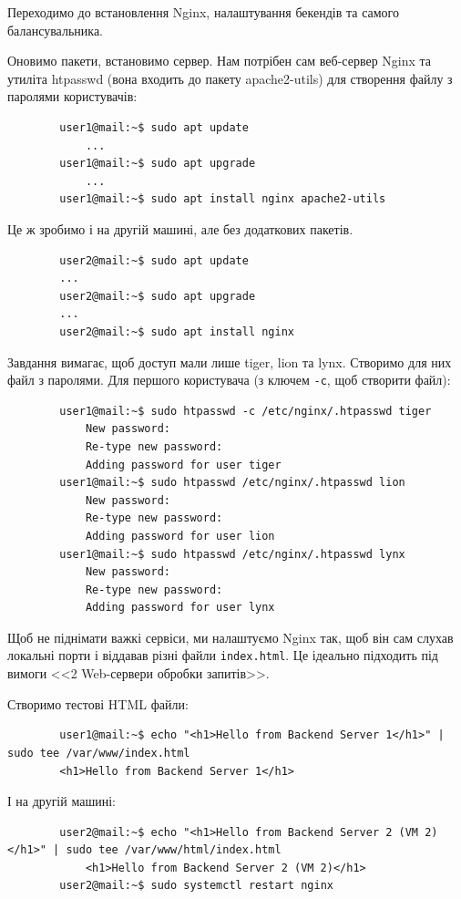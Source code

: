 \documentclass[14pt, a4paper]{extreport}
\begin{document}
	Переходимо до встановлення Nginx, налаштування бекендів та самого балансувальника.
	
	Оновимо пакети, встановимо сервер. Нам потрібен сам веб-сервер Nginx та утиліта htpasswd (вона входить до пакету apache2-utils) для створення файлу з паролями користувачів: \sideat{[VM 1]}
	
	\begin{verbatim}
		user1@mail:~$ sudo apt update
			...
		user1@mail:~$ sudo apt upgrade
			...
		user1@mail:~$ sudo apt install nginx apache2-utils
	\end{verbatim}
	
	Це ж зробимо і на другій машині, але без додаткових пакетів. \sideat{[VM 2]}
	
	\begin{verbatim}
		user2@mail:~$ sudo apt update
		...
		user2@mail:~$ sudo apt upgrade
		...
		user2@mail:~$ sudo apt install nginx
	\end{verbatim}
	
	
	Завдання вимагає, щоб доступ мали лише tiger, lion та lynx. Створимо для них файл з паролями. Для першого користувача (з ключем \texttt{-c}, щоб створити файл): \sideat{[VM 1]}
	
	\begin{verbatim}
		user1@mail:~$ sudo htpasswd -c /etc/nginx/.htpasswd tiger
			New password: 
			Re-type new password: 
			Adding password for user tiger
		user1@mail:~$ sudo htpasswd /etc/nginx/.htpasswd lion
			New password: 
			Re-type new password: 
			Adding password for user lion
		user1@mail:~$ sudo htpasswd /etc/nginx/.htpasswd lynx
			New password: 
			Re-type new password: 
			Adding password for user lynx
	\end{verbatim}
	
	Щоб не піднімати важкі сервіси, ми налаштуємо Nginx так, щоб він сам слухав локальні порти і віддавав різні файли \texttt{index.html}. Це ідеально підходить під вимоги <<2 Web-сервери обробки запитів>>.
	
	Створимо тестові HTML файли: \sideat{[VM 1]}
	
	\begin{verbatim}
		user1@mail:~$ echo "<h1>Hello from Backend Server 1</h1>" | sudo tee /var/www/index.html
		<h1>Hello from Backend Server 1</h1>
	\end{verbatim}
	
	І на другій машині: \sideat{[VM 2]}
	
	\begin{verbatim}
		user2@mail:~$ echo "<h1>Hello from Backend Server 2 (VM 2)</h1>" | sudo tee /var/www/html/index.html
			<h1>Hello from Backend Server 2 (VM 2)</h1>
		user2@mail:~$ sudo systemctl restart nginx
	\end{verbatim}
	
\end{document}
